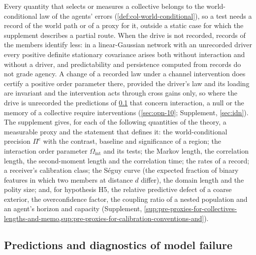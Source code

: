 Every quantity that selects or measures a collective belongs to the world-conditional law of the agents' errors (\cref{def:col-world-conditional}), so a test needs a record of the world path or of a proxy for it, outside a static case for which the supplement describes a partial route. When the drive is not recorded, records of the members identify less: in a linear-Gaussian network with an unrecorded driver every positive definite stationary covariance arises both without interaction and without a driver, and predictability and persistence computed from records do not grade agency. A change of a recorded law under a channel intervention does certify a positive order parameter there, provided the driver's law and its loading are invariant and the intervention acts through cross gains only, so where the drive is unrecorded the predictions of \cref{sec:pre-predictions} that concern interaction, a null or the memory of a collective require interventions (\cref{sec:opn-10}; Supplement, \cref{sec:idn}). The supplement gives, for each of the following quantities of the theory, a measurable proxy and the statement that defines it: the world-conditional precision $\Pi^c$ with the contrast, baseline and significance of a region; the interaction order parameter $\Omega_{\mathrm{int}}$ and its tests; the Markov length, the correlation length, the second-moment length and the correlation time; the rates of a record; a receiver's calibration class; the S\'eguy curve (the expected fraction of binary features in which two members at distance $d$ differ), the domain length and the polity size; and, for hypothesis H5, the relative predictive defect of a coarse exterior, the overconfidence factor, the coupling ratio of a nested population and an agent's horizon and capacity (Supplement, \cref{sup:pre-proxies-for-collectives-lengths-and-memo,sup:pre-proxies-for-calibration-conventions-and}).

\subsection{Predictions and diagnostics of model failure}\label{sec:pre-predictions}

